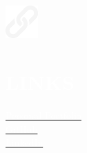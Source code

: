 \documentclass[../main.tex]{subfiles}
\begin{document}
    \hspace*{0.4cm}
    \begin{minipage}[t]{1.75cm}
        \vspace*{1.5cm}\includegraphics[width=1.25cm]{assets/link.png}
    \end{minipage}
    \begin{minipage}[t]{5cm}

        \vspace*{0.75cm}
        \section*{\textcolor{white}{LINKS}}
        \vspace*{-0.25cm}
        \textcolor{white}{
            \vspace*{0.1cm}\underline{\href{https://albatalaya.github.io/}{\textcolor{white}{Personal Portfolio}}} \\
            \vspace*{0.1cm}\underline{\href{https://www.github.com/albatalaya}{\textcolor{white}{GitHub}}}\\
            \underline{\href{https://www.linkedin.com/in/albatalaya}{\textcolor{white}{LinkedIn}}}
        }
    \end{minipage}
\end{document}
